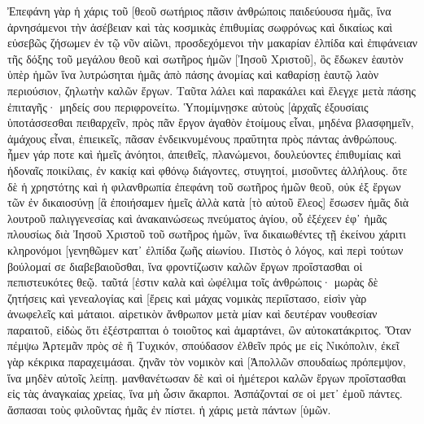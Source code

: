 Ἐπεφάνη γὰρ ἡ χάρις τοῦ [θεοῦ σωτήριος πᾶσιν ἀνθρώποις 
παιδεύουσα ἡμᾶς, ἵνα ἀρνησάμενοι τὴν ἀσέβειαν καὶ τὰς κοσμικὰς ἐπιθυμίας σωφρόνως καὶ δικαίως καὶ εὐσεβῶς ζήσωμεν ἐν τῷ νῦν αἰῶνι, 
προσδεχόμενοι τὴν μακαρίαν ἐλπίδα καὶ ἐπιφάνειαν τῆς δόξης τοῦ μεγάλου θεοῦ καὶ σωτῆρος ἡμῶν [Ἰησοῦ Χριστοῦ], 
ὃς ἔδωκεν ἑαυτὸν ὑπὲρ ἡμῶν ἵνα λυτρώσηται ἡμᾶς ἀπὸ πάσης ἀνομίας καὶ καθαρίσῃ ἑαυτῷ λαὸν περιούσιον, ζηλωτὴν καλῶν ἔργων. 
Ταῦτα λάλει καὶ παρακάλει καὶ ἔλεγχε μετὰ πάσης ἐπιταγῆς· μηδείς σου περιφρονείτω. 
Ὑπομίμνῃσκε αὐτοὺς [ἀρχαῖς ἐξουσίαις ὑποτάσσεσθαι πειθαρχεῖν, πρὸς πᾶν ἔργον ἀγαθὸν ἑτοίμους εἶναι, 
μηδένα βλασφημεῖν, ἀμάχους εἶναι, ἐπιεικεῖς, πᾶσαν ἐνδεικνυμένους πραΰτητα πρὸς πάντας ἀνθρώπους. 
ἦμεν γάρ ποτε καὶ ἡμεῖς ἀνόητοι, ἀπειθεῖς, πλανώμενοι, δουλεύοντες ἐπιθυμίαις καὶ ἡδοναῖς ποικίλαις, ἐν κακίᾳ καὶ φθόνῳ διάγοντες, στυγητοί, μισοῦντες ἀλλήλους. 
ὅτε δὲ ἡ χρηστότης καὶ ἡ φιλανθρωπία ἐπεφάνη τοῦ σωτῆρος ἡμῶν θεοῦ, 
οὐκ ἐξ ἔργων τῶν ἐν δικαιοσύνῃ [ἃ ἐποιήσαμεν ἡμεῖς ἀλλὰ κατὰ [τὸ αὐτοῦ ἔλεος] ἔσωσεν ἡμᾶς διὰ λουτροῦ παλιγγενεσίας καὶ ἀνακαινώσεως πνεύματος ἁγίου, 
οὗ ἐξέχεεν ἐφ᾽ ἡμᾶς πλουσίως διὰ Ἰησοῦ Χριστοῦ τοῦ σωτῆρος ἡμῶν, 
ἵνα δικαιωθέντες τῇ ἐκείνου χάριτι κληρονόμοι [γενηθῶμεν κατ᾽ ἐλπίδα ζωῆς αἰωνίου. 
Πιστὸς ὁ λόγος, καὶ περὶ τούτων βούλομαί σε διαβεβαιοῦσθαι, ἵνα φροντίζωσιν καλῶν ἔργων προΐστασθαι οἱ πεπιστευκότες θεῷ. ταῦτά [ἐστιν καλὰ καὶ ὠφέλιμα τοῖς ἀνθρώποις· 
μωρὰς δὲ ζητήσεις καὶ γενεαλογίας καὶ [ἔρεις καὶ μάχας νομικὰς περιΐστασο, εἰσὶν γὰρ ἀνωφελεῖς καὶ μάταιοι. 
αἱρετικὸν ἄνθρωπον μετὰ μίαν καὶ δευτέραν νουθεσίαν παραιτοῦ, 
εἰδὼς ὅτι ἐξέστραπται ὁ τοιοῦτος καὶ ἁμαρτάνει, ὢν αὐτοκατάκριτος. 
Ὅταν πέμψω Ἀρτεμᾶν πρὸς σὲ ἢ Τυχικόν, σπούδασον ἐλθεῖν πρός με εἰς Νικόπολιν, ἐκεῖ γὰρ κέκρικα παραχειμάσαι. 
ζηνᾶν τὸν νομικὸν καὶ [Ἀπολλῶν σπουδαίως πρόπεμψον, ἵνα μηδὲν αὐτοῖς λείπῃ. 
μανθανέτωσαν δὲ καὶ οἱ ἡμέτεροι καλῶν ἔργων προΐστασθαι εἰς τὰς ἀναγκαίας χρείας, ἵνα μὴ ὦσιν ἄκαρποι. 
Ἀσπάζονταί σε οἱ μετ᾽ ἐμοῦ πάντες. ἄσπασαι τοὺς φιλοῦντας ἡμᾶς ἐν πίστει. ἡ χάρις μετὰ πάντων [ὑμῶν. 
